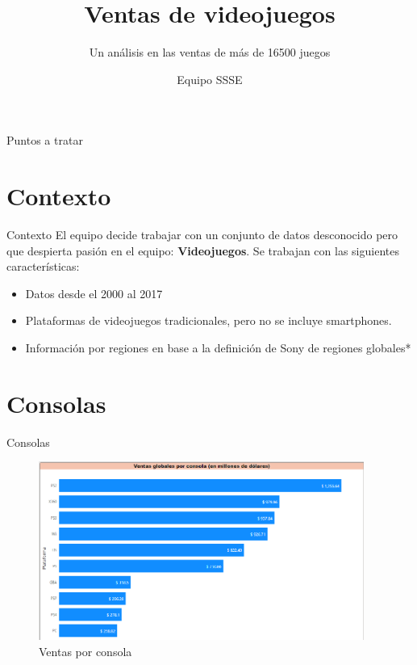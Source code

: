 \documentclass{beamer}
\title{Ventas de videojuegos}
\subtitle{Un análisis en las ventas de más de 16500 juegos}
\author{Equipo SSSE}
\begin{document}
	\begin{frame}
		\maketitle
	\end{frame}
	
	\begin{frame}{Puntos a tratar}
		\tableofcontents
	\end{frame}
	
	\section{Contexto}
	\begin{frame}[t]{Contexto}
		El equipo decide trabajar con un conjunto de datos desconocido pero que despierta pasión en el equipo: \textbf{Videojuegos}. Se trabajan con las siguientes características:
		\begin{itemize}
			\item Datos desde el 2000 al 2017
			\item Plataformas de videojuegos tradicionales, pero no se incluye smartphones.
			\item Información por regiones en base a la definición de Sony de regiones globales*
		\end{itemize}
	\end{frame}
	
	\section{Consolas}
	\begin{frame}[t]{Consolas}
		\begin{figure}
			\centering
			\includegraphics[width=4.2in]{m1.png}
			\caption{Ventas por consola}
		\end{figure}
	\end{frame}
	
\end{document}
